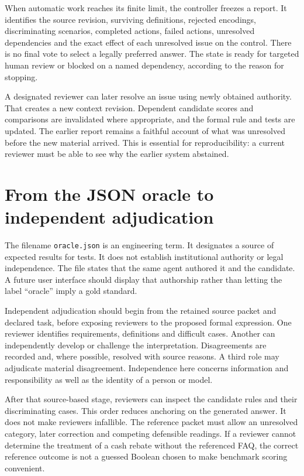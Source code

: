 When automatic work reaches its finite limit, the controller freezes a report.
It identifies the source revision, surviving definitions, rejected encodings,
discriminating scenarios, completed actions, failed actions, unresolved
dependencies and the exact effect of each unresolved issue on the control.
There is no final vote to select a legally preferred answer. The state is ready
for targeted human review or blocked on a named dependency, according to the
reason for stopping.

A designated reviewer can later resolve an issue using newly obtained authority.
That creates a new context revision. Dependent candidate scores and comparisons
are invalidated where appropriate, and the formal rule and tests are updated.
The earlier report remains a faithful account of what was unresolved before the
new material arrived. This is essential for reproducibility: a current reviewer
must be able to see why the earlier system abstained.

\section{From the JSON oracle to independent adjudication}
\label{merge:M02:08}

\label{sec:circular-independent}
The filename \texttt{oracle.json} is an engineering term. It designates a source
of expected results for tests. It does not establish institutional authority or
legal independence. The file states that the same agent authored it and the
candidate. A future user interface should display that authorship rather than
letting the label ``oracle'' imply a gold standard.

Independent adjudication should begin from the retained source packet and
declared task, before exposing reviewers to the proposed formal expression.
One reviewer identifies requirements, definitions and difficult cases. Another
can independently develop or challenge the interpretation. Disagreements are
recorded and, where possible, resolved with source reasons. A third role may
adjudicate material disagreement. Independence here concerns information and
responsibility as well as the identity of a person or model.


After that source-based stage, reviewers can inspect the candidate rules and
their discriminating cases. This order reduces anchoring on the generated
answer. It does not make reviewers infallible. The reference packet must allow
an unresolved category, later correction and competing defensible readings.
If a reviewer cannot determine the treatment of a cash rebate without the
referenced FAQ, the correct reference outcome is not a guessed Boolean chosen
to make benchmark scoring convenient.

